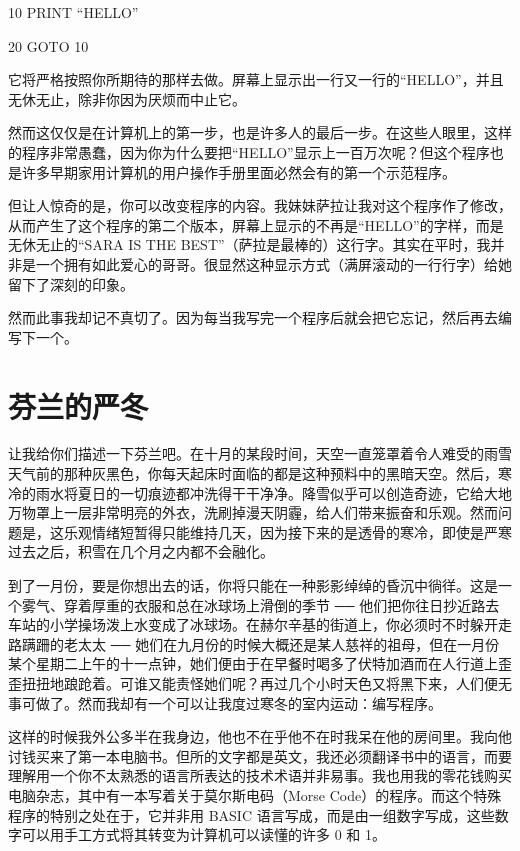 
10 PRINT “HELLO”

20 GOTO 10

 

它将严格按照你所期待的那样去做。屏幕上显示出一行又一行的“HELLO”，并且无休无止，除非你因为厌烦而中止它。

然而这仅仅是在计算机上的第一步，也是许多人的最后一步。在这些人眼里，这样的程序非常愚蠢，因为你为什么要把“HELLO”显示上一百万次呢？但这个程序也是许多早期家用计算机的用户操作手册里面必然会有的第一个示范程序。

但让人惊奇的是，你可以改变程序的内容。我妹妹萨拉让我对这个程序作了修改，从而产生了这个程序的第二个版本，屏幕上显示的不再是“HELLO”的字样，而是无休无止的“SARA IS THE BEST”（萨拉是最棒的）这行字。其实在平时，我并非是一个拥有如此爱心的哥哥。很显然这种显示方式（满屏滚动的一行行字）给她留下了深刻的印象。

然而此事我却记不真切了。因为每当我写完一个程序后就会把它忘记，然后再去编写下一个。

 
\section{芬兰的严冬}

让我给你们描述一下芬兰吧。在十月的某段时间，天空一直笼罩着令人难受的雨雪天气前的那种灰黑色，你每天起床时面临的都是这种预料中的黑暗天空。然后，寒冷的雨水将夏日的一切痕迹都冲洗得干干净净。降雪似乎可以创造奇迹，它给大地万物罩上一层非常明亮的外衣，洗刷掉漫天阴霾，给人们带来振奋和乐观。然而问题是，这乐观情绪短暂得只能维持几天，因为接下来的是透骨的寒冷，即使是严寒过去之后，积雪在几个月之内都不会融化。

到了一月份，要是你想出去的话，你将只能在一种影影绰绰的昏沉中徜徉。这是一个雾气、穿着厚重的衣服和总在冰球场上滑倒的季节 ── 他们把你往日抄近路去车站的小学操场泼上水变成了冰球场。在赫尔辛基的街道上，你必须时不时躲开走路蹒跚的老太太 ── 她们在九月份的时候大概还是某人慈祥的祖母，但在一月份某个星期二上午的十一点钟，她们便由于在早餐时喝多了伏特加酒而在人行道上歪歪扭扭地踉跄着。可谁又能责怪她们呢？再过几个小时天色又将黑下来，人们便无事可做了。然而我却有一个可以让我度过寒冬的室内运动：编写程序。

这样的时候我外公多半在我身边，他也不在乎他不在时我呆在他的房间里。我向他讨钱买来了第一本电脑书。但所的文字都是英文，我还必须翻译书中的语言，而要理解用一个你不太熟悉的语言所表达的技术术语并非易事。我也用我的零花钱购买电脑杂志，其中有一本写着关于莫尔斯电码（Morse Code）的程序。而这个特殊程序的特别之处在于，它并非用 BASIC 语言写成，而是由一组数字写成，这些数字可以用手工方式将其转变为计算机可以读懂的许多 0 和 1。

